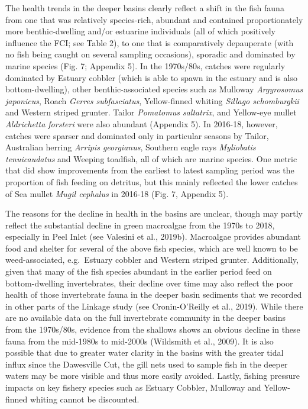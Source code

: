 \documentclass[
]{book}
\begin{document}
The health trends in the deeper basins clearly reflect a shift in the fish fauna from one that was relatively species-rich, abundant and contained proportionately more benthic-dwelling and/or estuarine individuals (all of which positively influence the FCI; see Table 2), to one that is comparatively depauperate (with no fish being caught on several sampling occasions), sporadic and dominated by marine species (Fig. 7; Appendix 5). In the 1970s/80s, catches were regularly dominated by Estuary cobbler (which is able to spawn in the estuary and is also bottom-dwelling), other benthic-associated species such as Mulloway \emph{Argyrosomus japonicus}, Roach \emph{Gerres subfasciatus}, Yellow-finned whiting \emph{Sillago schomburgkii} and Western striped grunter. Tailor \emph{Pomatomus saltatrix}, and Yellow-eye mullet \emph{Aldrichetta forsteri} were also abundant (Appendix 5). In 2016-18, however, catches were sparser and dominated only in particular seasons by Tailor, Australian herring \emph{Arripis georgianus}, Southern eagle rays \emph{Myliobatis tenuicaudatus} and Weeping toadfish, all of which are marine species. One metric that did show improvements from the earliest to latest sampling period was the proportion of fish feeding on detritus, but this mainly reflected the lower catches of Sea mullet \emph{Mugil cephalus} in 2016-18 (Fig. 7, Appendix 5).~

The reasons for the decline in health in the basins are unclear, though may partly reflect the substantial decline in green macroalgae from the 1970s to 2018, especially in Peel Inlet (see Valesini et al., 2019b). Macroalgae provides abundant food and shelter for several of the above fish species, which are well known to be weed-associated, e.g.~Estuary cobbler and Western striped grunter. Additionally, given that many of the fish species abundant in the earlier period feed on bottom-dwelling invertebrates, their decline over time may also reflect the poor health of those invertebrate fauna in the deeper basin sediments that we recorded in other parts of the Linkage study (see Cronin-O'Reilly et al., 2019). While there are no available data on the full invertebrate community in the deeper basins from the 1970s/80s, evidence from the shallows shows an obvious decline in these fauna from the mid-1980s to mid-2000s (Wildsmith et al., 2009). It is also possible that due to greater water clarity in the basins with the greater tidal influx since the Dawesville Cut, the gill nets used to sample fish in the deeper waters may be more visible and thus more easily avoided. Lastly, fishing pressure impacts on key fishery species such as Estuary Cobbler, Mulloway and Yellow-finned whiting cannot be discounted.
\end{document}
